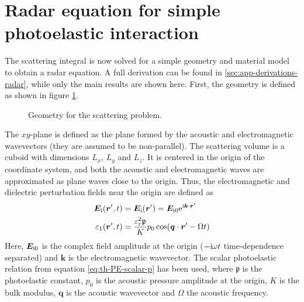 \documentclass[11pt,twoside]{eitExjobb}
\begin{document}
	\section{Radar equation for simple photoelastic interaction \label{sec:analytical-radar}}
	The scattering integral is now solved for a simple geometry and material model to obtain a radar equation. A full derivation can be found in \ref{sec:app-derivations-radar}, while only the main results are shown here. First, the geometry is defined as shown in figure \ref{fig:an-radar-geom}.
	\begin{figure}[h]
		\centering
		\resizebox{\textwidth}{!}{
			
		}
		\caption{\label{fig:an-radar-geom} Geometry for the scattering problem.}
	\end{figure}
	The $xy$-plane is defined as the plane formed by the acoustic and electromagnetic wavevectors (they are assumed to be non-parallel). The scattering volume is a cuboid with dimensions $L_{x}$, $L_{y}$ and $L_{z}$. It is centered in the origin of the coordinate system, and both the acoustic and electromagnetic waves are approximated as plane waves close to the origin. Thus, the electromagnetic and dielectric perturbation fields near the origin are defined as
	\begin{align*}
		\bm{E}_{\mathrm{i}} (\bm{r}',t) &= \bm{E}_{\mathrm{i}} (\bm{r}') = \bm{E}_{\mathrm{i}0} \mathrm{e}^{\mathrm{i} \bm{k}\cdot\bm{r}'} \\
		\varepsilon_1 (\bm{r}',t) &= \frac{\varepsilon_{\mathrm{r}}^2 \mathfrak{p}}{K} p_0 \cos(\bm{q} \cdot \bm{r}' - \Omega t)
	\end{align*}
	Here, $\bm{E}_{\mathrm{i}0}$ is the complex field amplitude at the origin ($-\mathrm{i}\omega t$ time-dependence separated) and $\bm{k}$ is the electromagnetic wavevector. The scalar photoelastic relation from equation \eqref{eq:th-PE-scalar-p} has been used, where $\mathfrak{p}$ is the photoelastic constant, $p_0$ is the acoustic pressure amplitude at the origin, $K$ is the bulk modulus, $\bm{q}$ is the acoustic wavevector and $\Omega$ the acoustic frequency.
	
\end{document}
